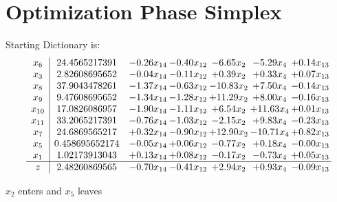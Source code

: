 \documentclass[9pt]{article}
\begin{document}
\section{Optimization Phase Simplex}
Starting Dictionary is:
\[\begin{array}{c| c c@{\hskip 2pt} c@{\hskip 2pt} c@{\hskip 2pt} c@{\hskip 2pt} c@{\hskip 2pt} }
 x_{6}   &  24.4565217391 & -0.26 x_{14} & -0.40 x_{12} & -6.65 x_{2} & -5.29 x_{4} & +  0.14 x_{13}\\
 x_{3}   &  2.82608695652 & -0.04 x_{14} & -0.11 x_{12} & +  0.39 x_{2} & +  0.33 x_{4} & +  0.07 x_{13}\\
 x_{8}   &  37.9043478261 & -1.37 x_{14} & -0.63 x_{12} & -10.83 x_{2} & +  7.50 x_{4} & -0.14 x_{13}\\
 x_{9}   &  9.47608695652 & -1.34 x_{14} & -1.28 x_{12} & + 11.29 x_{2} & +  8.00 x_{4} & -0.16 x_{13}\\
 x_{10}   &  17.0826086957 & -1.90 x_{14} & -1.11 x_{12} & +  6.54 x_{2} & + 11.63 x_{4} & +  0.01 x_{13}\\
 x_{11}   &  33.2065217391 & -0.76 x_{14} & -1.03 x_{12} & -2.15 x_{2} & +  9.83 x_{4} & -0.23 x_{13}\\
 x_{7}   &  24.6869565217 & +  0.32 x_{14} & -0.90 x_{12} & + 12.90 x_{2} & -10.71 x_{4} & +  0.82 x_{13}\\
 x_{5}   &  0.458695652174 & -0.05 x_{14} & +  0.06 x_{12} & -0.77 x_{2} & +  0.18 x_{4} & -0.00 x_{13}\\
 x_{1}   &  1.02173913043 & +  0.13 x_{14} & +  0.08 x_{12} & -0.17 x_{2} & -0.73 x_{4} & +  0.05 x_{13}\\
\hline
z    &  2.48260869565 & -0.70 x_{14} & -0.41 x_{12} & +  2.94 x_{2} & +  0.93 x_{4} & -0.09 x_{13}\\
\end{array}\]


 $ x_{2} $ enters and $ x_{5} $ leaves 
\end{document}

